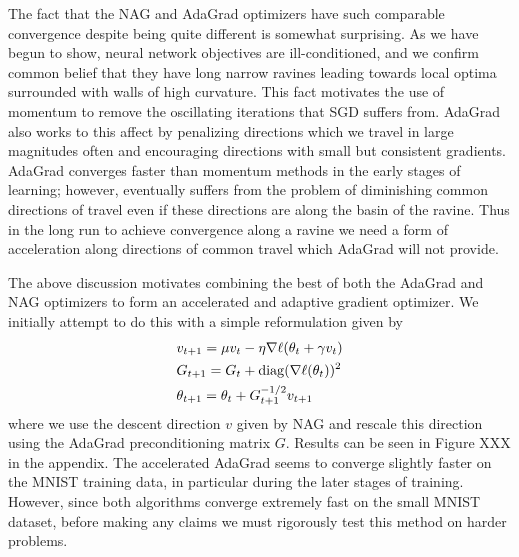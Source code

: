 The fact that the NAG and AdaGrad optimizers have such comparable convergence
despite being quite different is somewhat surprising. As we have begun to show,
neural network objectives are ill-conditioned, and we confirm common belief
that they have long narrow ravines leading towards local optima surrounded with
walls of high curvature. This fact motivates the use of momentum to remove the
oscillating iterations that SGD suffers from. AdaGrad also works to this affect
by penalizing directions which we travel in large magnitudes often and
encouraging directions with small but consistent gradients. AdaGrad converges
faster than momentum methods in the early stages of learning; however,
eventually suffers from the problem of diminishing common directions of travel
even if these directions are along the basin of the ravine. Thus in the long
run to achieve convergence along a ravine we need a form of acceleration along
directions of common travel which AdaGrad will not provide. 

The above discussion motivates combining the best of both the AdaGrad and
NAG optimizers to form an accelerated and adaptive gradient optimizer. We
initially attempt to do this with a simple reformulation given by
\begin{align*}
&v_{t+1} = \mu v_t - \eta \nabla \ell (\theta_t + \gamma v_t) \\
&G_{t+1} = G_{t} + \operatorname*{diag}(\nabla \ell (\theta_t))^2 \\
&\theta_{t+1} = \theta_t + G_{t+1}^{-1/2} v_{t+1}
\end{align*}
where we use the descent direction $v$ given by NAG and rescale this direction
using the AdaGrad preconditioning matrix $G$. Results can be seen in Figure XXX
in the appendix. The accelerated AdaGrad seems to converge slightly faster on
the MNIST training data, in particular during the later stages of training.
However, since both algorithms converge extremely fast on the small MNIST
dataset, before making any claims we must rigorously test this method on harder
problems.

